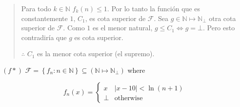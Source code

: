 \documentclass[a4paper, 12pt]{article}
\begin{document}
\small
\begin{quote}

Para todo $k\in \mathbb{N}$ $f_k(n) \leq 1$. Por lo tanto la función que es
constantemente $1$, $C_1$, es cota superior de $\mathcal{F}$. Sea 
$g \in \mathbb{N} \mapsto \mathbb{N}_\bot$ otra cota superior de $\mathcal{F}$.
Como $1$ es el menor natural, $g \leq C_1 \iff g = \bot $. Pero esto
contradiría que $g$ es cota superior. 

$\therefore $ $C_1$ es la menor cota superior (el supremo).


\end{quote}
\normalsize


$(f*)$ $\mathcal{F} = \left\{ f_n : n \in \mathbb{N} \right\} \subseteq
\left( \mathbb{N} \mapsto \mathbb{N}_\bot  \right) $ where 

\begin{equation*}
  f_n(x) = \begin{cases}
    x & |x - 10| < \ln \left( n + 1 \right) \\ 
    \bot  & \text{otherwise}
  \end{cases}
\end{equation*}
\end{document}
